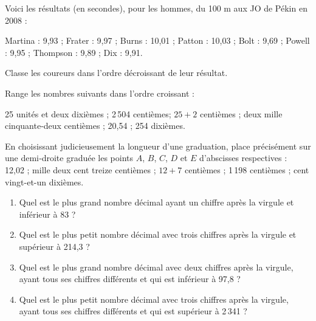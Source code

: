 \begin{exercice}
Voici les résultats (en secondes), pour les hommes, du 100 m aux JO de Pékin en 2008 : \vspace{0.75em}

Martina : 9,93 ; Frater : 9,97 ; Burns : 10,01 ; Patton : 10,03 ; Bolt : 9,69 ; Powell : 9,95 ; Thompson : 9,89 ; Dix : 9,91.\vspace{0.75em}

Classe les coureurs dans l'ordre décroissant de leur résultat.
\end{exercice}


\begin{exercice}[À ordonner]
Range les nombres suivants dans l'ordre croissant : \vspace{0.75em}

25 unités et deux dixièmes ; 2\,504 centièmes; $25 + 2$ centièmes ; deux mille cinquante‑deux centièmes ; 20,54 ; 254 dixièmes.
\end{exercice}


\begin{exercice}[À placer]
En choisissant judicieusement la longueur d'une graduation, place précisément sur une demi‑droite graduée les points $A$, $B$, $C$, $D$ et $E$ d'abscisses respectives : \\[0.75em]
12,02 ; mille deux cent treize centièmes ; $12 + 7$ centièmes ; 1\,198 centièmes ; cent vingt-et-un dixièmes.
\end{exercice}


\begin{exercice}[Comparaison]
\begin{enumerate}
 \item Quel est le plus grand nombre décimal ayant un chiffre après la virgule et inférieur à 83 ?
 \item Quel est le plus petit nombre décimal avec trois chiffres après la virgule et supérieur à 214,3 ?
 \item Quel est le plus grand nombre décimal avec deux chiffres après la virgule, ayant tous ses chiffres différents et qui est inférieur à 97,8 ?
 \item Quel est le plus petit nombre décimal avec trois chiffres après la virgule, ayant tous ses chiffres différents et qui est supérieur à 2\,341 ?
 \end{enumerate}
\end{exercice}


